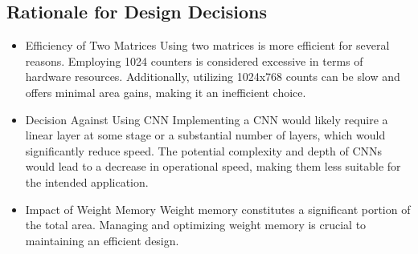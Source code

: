 \documentclass[conference]{IEEEtran}
\begin{document}
    \subsection{Rationale for Design Decisions}
    \begin{itemize}
        \item Efficiency of Two Matrices
        Using two matrices is more efficient for several reasons. Employing 1024 counters is considered excessive in terms of hardware resources. Additionally, utilizing 1024x768 counts can be slow and offers minimal area gains, making it an inefficient choice.
        \item Decision Against Using CNN
        Implementing a CNN would likely require a linear layer at some stage or a substantial number of layers, which would significantly reduce speed. The potential complexity and depth of CNNs would lead to a decrease in operational speed, making them less suitable for the intended application.
        \item Impact of Weight Memory
        Weight memory constitutes a significant portion of the total area. Managing and optimizing weight memory is crucial to maintaining an efficient design.
    \end{itemize}
\end{document}
